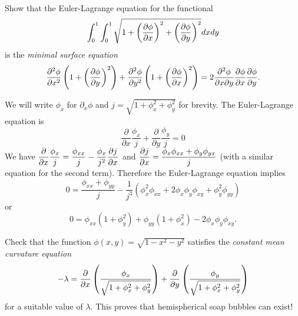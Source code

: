 \documentclass[12pt]{article}
\begin{document}
\begin{question}\ \\
Show that the Euler-Lagrange equation for the functional
\[\int_0^1\int_0^1\sqrt{1+\left(\dfrac{\partial \phi}{\partial x}\right)^2+\left(\dfrac{\partial \phi}{\partial y}\right)^2}dxdy\]
is the {\em minimal surface equation}
\[\dfrac{\partial^2 \phi}{\partial x^2}\left(1+\left(\dfrac{\partial \phi}{\partial y}\right)^2\right)+\dfrac{\partial^2 \phi}{\partial y^2}\left(1+\left(\dfrac{\partial \phi}{\partial x}\right)^2\right)=2\dfrac{\partial^2 \phi}{\partial x\partial y}\dfrac{\partial \phi}{\partial x}\dfrac{\partial \phi}{\partial y}.\]
\end{question}

\begin{answer}
We will write $\phi_x$ for $\partial_x\phi$ and $j=\sqrt{1+\phi_x^2+\phi_y^2}$ for brevity. The Euler-Lagrange equation is
\[\frac{\partial}{\partial x}\frac{\phi_x}{j}+\frac{\partial}{\partial y}\frac{\phi_y}{j}=0\]
We have $\dfrac{\partial }{\partial x}\dfrac{\phi_x}{j}=\dfrac{\phi_{xx}}{j}-\dfrac{\phi_x}{j^2}\dfrac{\partial j}{\partial x}$ and $\dfrac{\partial j}{\partial x}=\dfrac{\phi_x\phi_{xx}+\phi_y\phi_{yx}}{j}$ (with a similar equation for the second term). Therefore the Euler-Lagrange equation implies
\[
0=\frac{\phi_{xx}+\phi_{yy}}{j}-\frac{1}{j^3}\left(\phi_x^2\phi_{xx}+2\phi_x\phi_y\phi_{xy}+\phi_y^2\phi_{yy}\right)
\]
or
\[0=\phi_{xx}(1+\phi_y^2)+\phi_{yy}(1+\phi_x^2)-2\phi_x\phi_y\phi_{xy}.\]
\end{answer}
\newpage

\bigskip

\begin{question}
Check that the function $\phi(x,y)=\sqrt{1-x^2-y^2}$ satisfies the {\em constant mean curvature equation}
\[-\lambda=\dfrac{\partial }{\partial x}\left(\frac{\phi_x}{\sqrt{1+\phi_x^2+\phi_y^2}}\right)+\dfrac{\partial }{\partial y}\left(\frac{\phi_y}{\sqrt{1+\phi_x^2+\phi_y^2}}\right)\]
for a suitable value of $\lambda$. This proves that hemispherical soap bubbles can exist!
\end{question}
\end{document}
